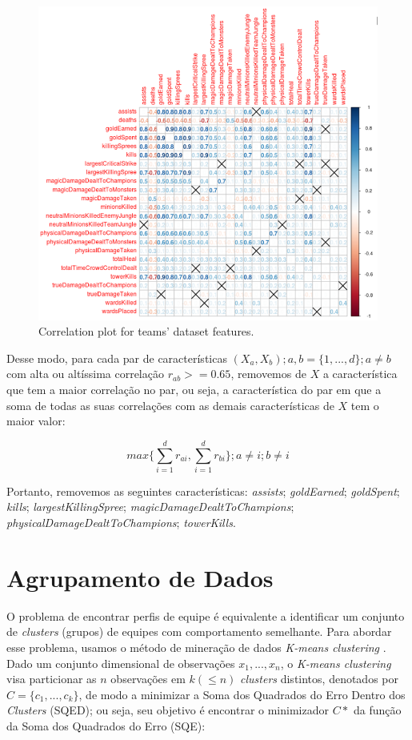 \begin{figure}
  \centering
  \includegraphics[width=1.0\textwidth]{correlations}%
  \caption{Correlation plot for teams' dataset features.}
  \label{fig:correlations}
\end{figure}

Desse modo, para cada par de características $(X_a, X_b); a, b=\{1, ..., d\};a \neq b$ com alta ou altíssima correlação $r_{ab} >= 0.65$, removemos de $X$ a característica que tem a maior correlação no par, ou seja, a característica do par em que a soma de todas as suas correlações com as demais características de $X$ tem o maior valor:

\begin{displaymath}
  max \big\{ \sum_{i=1}^{d} r_{ai} ,  \sum_{i=1}^{d} r_{bi} \big\}; a \neq i; b \neq i
\end{displaymath}

Portanto, removemos as seguintes características: \textit{assists}; \textit{goldEarned}; \textit{goldSpent}; \textit{kills}; \textit{largestKillingSpree}; \textit{magicDamageDealtToChampions}; \textit{physicalDamageDealtToChampions}; \textit{towerKills}.

\chapter{Agrupamento de Dados}

O problema de encontrar perfis de equipe é equivalente a identificar um conjunto de \textit{clusters} (grupos) de equipes com comportamento semelhante. Para abordar esse problema, usamos o método de mineração de dados \textit{K-means clustering} \cite{zaki2014data}. Dado um conjunto dimensional de observações \(x_1, ..., x_n \), o \textit{K-means clustering} visa particionar as $n$ observações em $k (\leq n)$ \textit{clusters} distintos, denotados por $ C = \{c_1, ... , c_k \} $, de modo a minimizar a Soma dos Quadrados do Erro Dentro dos \textit{Clusters} (SQED); ou seja, seu objetivo é encontrar o minimizador $C*$ da função da Soma dos Quadrados do Erro (SQE):

